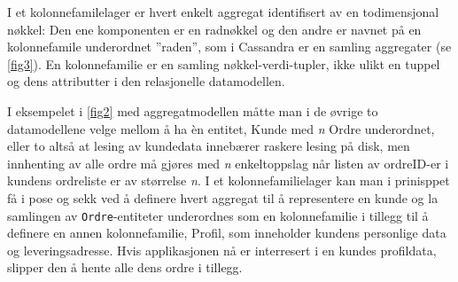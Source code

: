 I et kolonnefamilelager er hvert enkelt aggregat identifisert av en todimensjonal nøkkel: Den ene komponenten er en radnøkkel og den andre er navnet på en kolonnefamile underordnet ''raden'', som i Cassandra er en samling aggregater (se \ref{fig3}). En kolonnefamilie er en samling nøkkel-verdi-tupler, ikke ulikt en tuppel og dens attributter i den relasjonelle datamodellen.

I eksempelet i \ref{fig2} med aggregatmodellen måtte man i de øvrige to datamodellene velge mellom å ha èn entitet, Kunde med \emph{n} Ordre underordnet, eller to altså at lesing av kundedata innebærer raskere lesing på disk, men innhenting av alle ordre må gjøres med \emph{n} enkeltoppslag når listen av ordreID-er i kundens ordreliste er av størrelse \emph{n}. I et kolonnefamilielager kan man i prinisppet få i pose og sekk ved å definere hvert aggregat til å representere en kunde og la samlingen av \texttt{Ordre}-entiteter underordnes som en kolonnefamilie i tillegg til å definere en annen kolonnefamilie, Profil, som inneholder kundens personlige data og leveringsadresse. Hvis applikasjonen nå er interresert i en kundes profildata, slipper den å hente alle dens ordre i tillegg.

